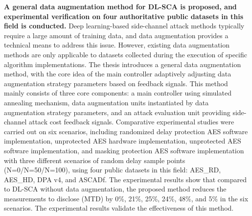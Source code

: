 \textbf{A general data augmentation method for DL-SCA is proposed, and experimental verification on four authoritative public datasets in this field is conducted.} Deep learning-based side-channel attack methods typically require a large amount of training data, and data augmentation provides a technical means to address this issue. However, existing data augmentation methods are only applicable to datasets collected during the execution of specific algorithm implementations. The thesis introduces a general data augmentation method, with the core idea of the main controller adaptively adjusting data augmentation strategy parameters based on feedback signals. This method mainly consists of three core components: a main controller using simulated annealing mechanism, data augmentation units instantiated by data augmentation strategy parameters, and an attack evaluation unit providing side-channel attack cost feedback signals. Comparative experimental studies were carried out on six scenarios, including randomized delay protection AES software implementation, unprotected AES hardware implementation, unprotected AES software implementation, and masking protection AES software implementation with three different scenarios of random delay sample points (N=0/N=50/N=100), using four public datasets in this field: AES\_RD, AES\_HD, DPA v4, and ASCADf. The experimental results show that compared to DL-SCA without data augmentation, the proposed method reduces the measurements to disclose (MTD) by 0\%, 21\%, 25\%, 24\%, 48\%, and 5\% in the six scenarios. The experimental results validate the effectiveness of this method.


